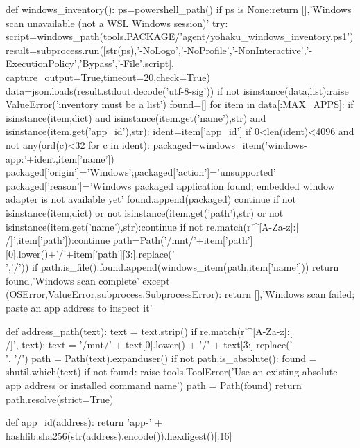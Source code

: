 def windows_inventory():
    ps=powershell_path()
    if ps is None:return [],'Windows scan unavailable (not a WSL Windows session)'
    try:
        script=windows_path(tools.PACKAGE/'agent/yohaku_windows_inventory.ps1')
        result=subprocess.run([str(ps),'-NoLogo','-NoProfile','-NonInteractive','-ExecutionPolicy','Bypass','-File',script],
                              capture_output=True,timeout=20,check=True)
        data=json.loads(result.stdout.decode('utf-8-sig'))
        if not isinstance(data,list):raise ValueError('inventory must be a list')
        found=[]
        for item in data[:MAX_APPS]:
            if isinstance(item,dict) and isinstance(item.get('name'),str) and isinstance(item.get('app_id'),str):
                ident=item['app_id']
                if 0<len(ident)<4096 and not any(ord(c)<32 for c in ident):
                    packaged=windows_item('windows-app:'+ident,item['name'])
                    packaged['origin']='Windows';packaged['action']='unsupported'
                    packaged['reason']='Windows packaged application found; embedded window adapter is not available yet'
                    found.append(packaged)
                continue
            if not isinstance(item,dict) or not isinstance(item.get('path'),str) or not isinstance(item.get('name'),str):continue
            if not re.match(r'^[A-Za-z]:[\\/]',item['path']):continue
            path=Path('/mnt/'+item['path'][0].lower()+'/'+item['path'][3:].replace('\\','/'))
            if path.is_file():found.append(windows_item(path,item['name']))
        return found,'Windows scan complete'
    except (OSError,ValueError,subprocess.SubprocessError):
        return [],'Windows scan failed; paste an app address to inspect it'


def address_path(text):
    text = text.strip()
    if re.match(r'^[A-Za-z]:[\\/]', text):
        text = '/mnt/' + text[0].lower() + '/' + text[3:].replace('\\', '/')
    path = Path(text).expanduser()
    if not path.is_absolute():
        found = shutil.which(text)
        if not found:
            raise tools.ToolError('Use an existing absolute app address or installed command name')
        path = Path(found)
    return path.resolve(strict=True)


def app_id(address):
    return 'app-' + hashlib.sha256(str(address).encode()).hexdigest()[:16]


